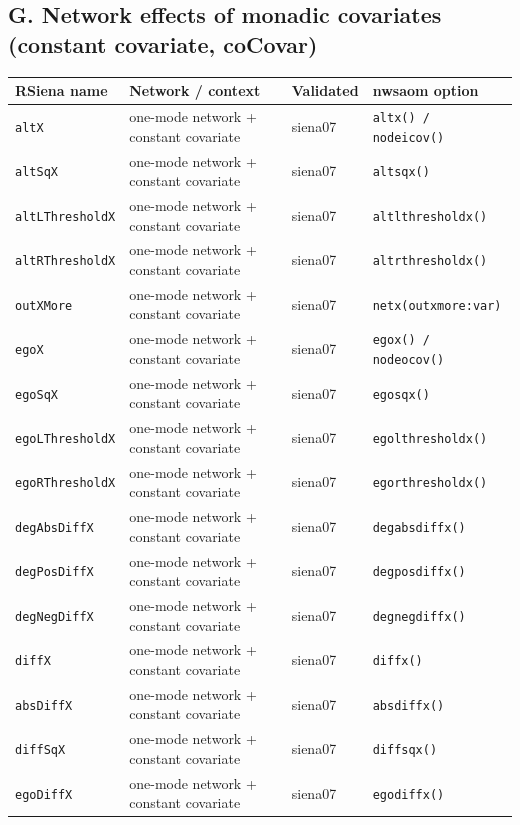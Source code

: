 \subsection*{G. Network effects of monadic covariates (constant covariate, coCovar)}
\footnotesize
\begin{longtable}{@{}p{2.6cm}p{3.2cm}p{2.9cm}p{5.4cm}@{}}
\toprule
RSiena name & Network / context & Validated & nwsaom option\\
\midrule
\endhead
\texttt{altX} & one-mode network + constant covariate & siena07 & \texttt{altx() / nodeicov()}\\
\texttt{altSqX} & one-mode network + constant covariate & siena07 & \texttt{altsqx()}\\
\texttt{altLThresholdX} & one-mode network + constant covariate & siena07 & \texttt{altlthresholdx()}\\
\texttt{altRThresholdX} & one-mode network + constant covariate & siena07 & \texttt{altrthresholdx()}\\
\texttt{outXMore} & one-mode network + constant covariate & siena07 & \texttt{netx(outxmore:var)}\\
\texttt{egoX} & one-mode network + constant covariate & siena07 & \texttt{egox() / nodeocov()}\\
\texttt{egoSqX} & one-mode network + constant covariate & siena07 & \texttt{egosqx()}\\
\texttt{egoLThresholdX} & one-mode network + constant covariate & siena07 & \texttt{egolthresholdx()}\\
\texttt{egoRThresholdX} & one-mode network + constant covariate & siena07 & \texttt{egorthresholdx()}\\
\texttt{degAbsDiffX} & one-mode network + constant covariate & siena07 & \texttt{degabsdiffx()}\\
\texttt{degPosDiffX} & one-mode network + constant covariate & siena07 & \texttt{degposdiffx()}\\
\texttt{degNegDiffX} & one-mode network + constant covariate & siena07 & \texttt{degnegdiffx()}\\
\texttt{diffX} & one-mode network + constant covariate & siena07 & \texttt{diffx()}\\
\texttt{absDiffX} & one-mode network + constant covariate & siena07 & \texttt{absdiffx()}\\
\texttt{diffSqX} & one-mode network + constant covariate & siena07 & \texttt{diffsqx()}\\
\texttt{egoDiffX} & one-mode network + constant covariate & siena07 & \texttt{egodiffx()}\\

\end{longtable}
